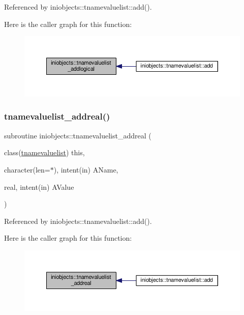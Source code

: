Referenced by iniobjects\+::tnamevaluelist\+::add().

Here is the caller graph for this function\+:
\nopagebreak
\begin{figure}[H]
\begin{center}
\leavevmode
\includegraphics[width=350pt]{namespaceiniobjects_a73327dd98a8e02b51bff94237d0cad1d_icgraph}
\end{center}
\end{figure}
\mbox{\label{namespaceiniobjects_a4ede9664ab0d5e4d00d1983e70c64322}} 
\subsubsection{\texorpdfstring{tnamevaluelist\+\_\+addreal()}{tnamevaluelist\_addreal()}}
{\footnotesize\ttfamily subroutine iniobjects\+::tnamevaluelist\+\_\+addreal (\begin{DoxyParamCaption}\item[{class(\mbox{\hyperlink{structiniobjects_1_1tnamevaluelist}{tnamevaluelist}})}]{this,  }\item[{character(len=$\ast$), intent(in)}]{A\+Name,  }\item[{real, intent(in)}]{A\+Value }\end{DoxyParamCaption})\hspace{0.3cm}{\ttfamily [private]}}



Referenced by iniobjects\+::tnamevaluelist\+::add().

Here is the caller graph for this function\+:
\nopagebreak
\begin{figure}[H]
\begin{center}
\leavevmode
\includegraphics[width=350pt]{namespaceiniobjects_a4ede9664ab0d5e4d00d1983e70c64322_icgraph}
\end{center}
\end{figure}
\mbox{\label{namespaceiniobjects_a5f3c26a113f5171e6bdf68705ced9854}} 
